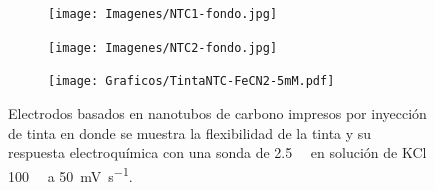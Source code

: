  	  			\begin{figure}[h!]
		 	   	    \begin{subfigure}[t]{0.25\textwidth}
			       	\texttt{[image: Imagenes/NTC1-fondo.jpg]}
			   		\end{subfigure}
			   		\begin{subfigure}[t]{0.25\textwidth}
			       	\texttt{[image: Imagenes/NTC2-fondo.jpg]}
			   		\end{subfigure}
			   		\begin{subfigure}[t]{0.43\textwidth}
			   	    \texttt{[image: Graficos/TintaNTC-FeCN2-5mM.pdf]}
			   		\end{subfigure}
					 \caption[Electrodos de NTC flexibles.]{Electrodos basados en nanotubos de carbono impresos por inyección de tinta en  donde se muestra la flexibilidad de la tinta y su respuesta electroquímica con una sonda de \fe\space \SI{2.5}{\milli\Molar} en solución de KCl \SI{100}{\milli\Molar} a \SI{50}{\milli\volt\per\second}.}
					 \label{fig:tintas}	
				     \end{figure}

